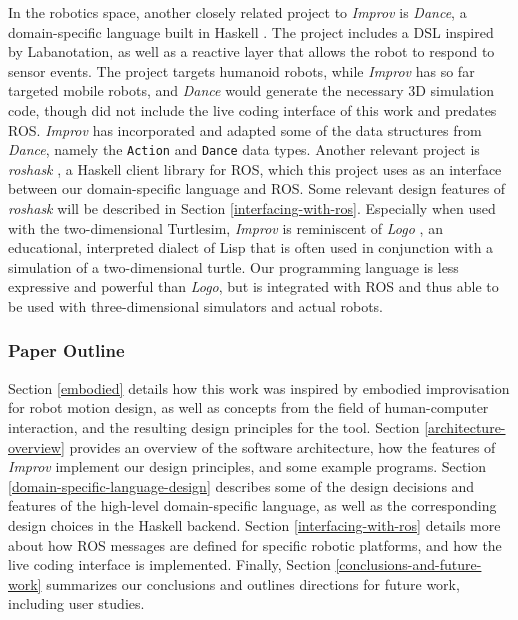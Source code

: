 \documentclass[sigconf]{acmart}
\begin{document}
In the robotics space, another closely related project to \emph{Improv} is \emph{Dance}, a
domain-specific language built in Haskell \cite{Dance2003}. The project includes
a DSL inspired by Labanotation, as well as a reactive layer that allows the
robot to respond to sensor events. The project targets humanoid robots, while
\emph{Improv} has so far targeted mobile robots, and \emph{Dance} would generate
the necessary 3D simulation code, though did not include the live coding
interface of this work and predates ROS. \emph{Improv} has incorporated and
adapted some of the data structures from \emph{Dance}, namely the
\texttt{Action} and \texttt{Dance} data types. Another relevant project is
\emph{roshask} \cite{cowley2011stream}, a Haskell client library for ROS, which
this project uses as an interface between our domain-specific language and ROS.
Some relevant design features of \emph{roshask} will be described in Section
\ref{interfacing-with-ros}. Especially when used with the two-dimensional Turtlesim, \emph{Improv}
is reminiscent of \emph{Logo} \cite{logo}, an educational, interpreted
dialect of Lisp that is often used in conjunction with a simulation of a
two-dimensional turtle. Our programming language is less expressive and powerful 
than \emph{Logo}, but is integrated with ROS and thus able to be used with
three-dimensional simulators and actual robots.

\subsubsection*{Paper Outline}

Section \ref{embodied} details how this work was inspired by embodied
improvisation for robot motion design, as well as concepts from the field of human-computer
interaction, and the resulting design principles for the tool.
Section
\ref{architecture-overview} provides an overview of the software architecture,
how the features of \emph{Improv} implement
our design principles, and some example programs. Section
\ref{domain-specific-language-design} describes some of the design decisions and
features of the high-level domain-specific language, as well as the
corresponding design choices in the Haskell backend. 
Section \ref{interfacing-with-ros} details more about how ROS messages are
defined for specific robotic platforms, and how the live coding interface is
implemented. Finally, Section
\ref{conclusions-and-future-work} summarizes our conclusions and outlines directions
for future work, including user studies.
\end{document}
